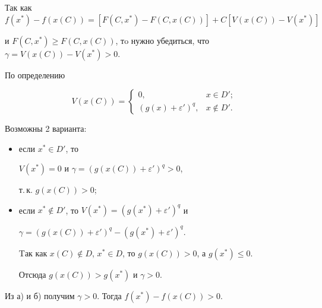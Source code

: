 \begin{pf}


Так как $f(x^*)-f(x(C))=[F(C,x^*)-F(C,x(C))]+C[V(x(C))-V(x^*)]$ 


и $F(C,x^*)\geq F(C,x(C))$, тo нужно убедиться, что $\gamma=V(x(C))-V(x^*)>0$.


По определению 


$$


V(x(C))=\begin{cases}


0,  & x\in D';\\


(g(x)+\varepsilon')^q, & x\notin D'.


\end{cases}


$$


Возможны 2 варианта:


\begin{itemize}


\item[a)] если $x^*\in D'$, то


$V(x^*)=0$ и $\gamma=(g(x(C))+\varepsilon')^q>0$,


т.\,к. $g(x(C))>0$;


\item[б)] если $x^*\notin D'$, то $V(x^*)=(g(x^*)+\varepsilon')^q$ и 


$\gamma=(g(x(C))+\varepsilon')^q-(g(x^*)+\varepsilon')^q.$


Tак как $x(C)\notin D$, $x^*\in D$, то $g(x(C))>0$, а $g(x^*)\leq 0.$


Отсюда $g(x(C))>g(x^*)$ и $\gamma>0$.


\end{itemize}


Из а) и б) получим $\gamma>0$. Тогда $f(x^*)-f(x(C))>0$.


\end{pf}





